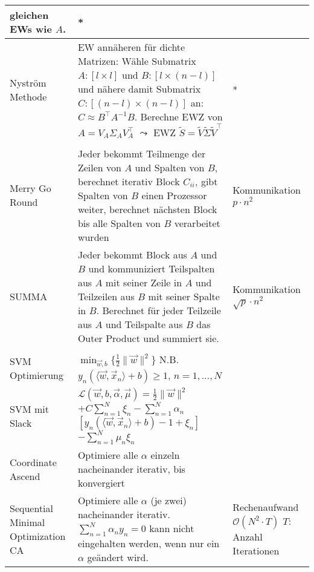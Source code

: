 \documentclass[11pt]{scrartcl}
\begin{document}
\begin{xltabular}{\linewidth}{p{25mm}|p{70mm}p{35mm}}
        gleichen EWs wie $A$. & 
         *  \\
        \hline
    Nyström Methode & 
        EW annäheren für dichte Matrizen: Wähle Submatrix $A : [l \times l]$ und 
        $B : [l \times (n - l)]$ und nähere damit Submatrix $C : [(n - l) \times (n - l)]$ an: 
        $C \approx B^\top A^{-1} B$. Berechne EWZ von $A = V_A \Sigma_A V_A^\top$ 
        $\leadsto$ EWZ $\tilde{S} = \tilde{V} \tilde{\Sigma} \tilde{V}^\top$ & 
         *  \\
    \hline
    & \vspace{-1em} & \\ \hline
    Merry Go Round & 
        Jeder bekommt Teilmenge der Zeilen von $A$ und Spalten von $B$, berechnet
        iterativ Block $C_{ii}$, gibt Spalten von $B$ einen Prozessor weiter, berechnet nächsten Block bis alle Spalten von $B$ verarbeitet wurden & 
        Kommunikation $p \cdot n^2$ \\
    \hline
    SUMMA & 
        Jeder bekommt Block aus $A$ und $B$ und kommuniziert Teilspalten aus $A$ mit seiner
        Zeile in $A$ und Teilzeilen aus $B$ mit seiner Spalte in $B$. Berechnet für jeder Teilzeile aus $A$
        und Teilspalte aus $B$ das Outer Product und summiert sie. & 
        Kommunikation $\sqrt{p} \cdot n^2$ \\
    \hline
    & \vspace{-1em} & \\ \hline
    SVM Optimierung & 
        $\min_{\vec{w},b} \{ \frac{1}{2} \| \vec{w} \|^2 \}$ N.B. $y_n ( \langle \vec{w}, \vec{x}_n \rangle + b) \geq 1$, $n = 1, \dots, N$  & 
         \\
    \hline
    SVM mit Slack & 
        $\mathcal{L}(\vec{w}, b, \vec{\alpha}, \vec{\mu}) = \frac{1}{2}\| 
        \vec{w} \|^2 $ $ + C \sum_{n=1}^N \xi_n - \sum_{n=1}^N \alpha_n $ 
        $ [ y_n(\langle \vec{w}, \vec{x}_n \rangle + b) - 1 + \xi_n] $ 
        $ - \sum_{n=1}^N \mu_n \xi_n$ & 
         \\
    \hline
    Coordinate Ascend & 
        Optimiere alle $\alpha$ einzeln nacheinander iterativ, bis konvergiert & 
         \\
    \hline
    Sequential Minimal Optimization CA & 
        Optimiere alle $\alpha$ (je zwei) nacheinander iterativ. 
        $\sum_{n=1}^N \alpha_n y_n = 0$ kann nicht eingehalten werden, wenn 
        nur ein $\alpha$ geändert wird. & 
        Rechenaufwand $\mathcal{O}(N^2 \cdot T)$ $T$: Anzahl Iterationen \\

\end{xltabular}
\end{document}
